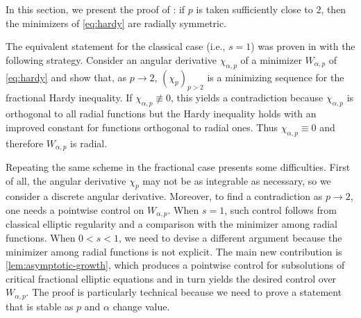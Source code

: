 \documentclass[10pt, reqno]{amsart}
\theoremstyle{plain}
\theoremstyle{remark}
\theoremstyle{definition}
\numberwithin{equation}{section}
\theoremstyle{plain}
\begin{document}
In this section, we present the proof of : if $p$ is taken sufficiently close to $2$, then the minimizers of \cref{eq:hardy} are radially symmetric. 

The equivalent statement for the classical case (i.e., $s=1$) was proven in \cite[Theorem 1.1]{Dolbeault2009} with the following strategy.
Consider an angular derivative $\chi_{\alpha, p}$ of a minimizer $W_{\alpha,p}$ of \cref{eq:hardy} and show that, as $p\to 2$, $(\chi_p)_{p>2}$ is a minimizing sequence for the fractional Hardy inequality. If $\chi_{\alpha, p}\not\equiv0$, this yields a contradiction because $\chi_{\alpha,p}$ is orthogonal to all radial functions but the Hardy inequality holds with an improved constant for functions orthogonal to radial ones. Thus $\chi_{\alpha,p}\equiv 0$ and therefore $W_{\alpha,p}$ is radial.

Repeating the same scheme in the fractional case presents some difficulties. First of all, the angular derivative $\chi_p$ may not be as integrable as necessary, so we consider a discrete angular derivative. 
Moreover, to find a contradiction as $p\to 2$, one needs a pointwise control on $W_{\alpha,p}$. When $s=1$, such control follows from classical elliptic regularity and a comparison with the minimizer among radial functions. 
 When $0<s<1$, we need to devise a different argument because the minimizer among radial functions is not explicit. The main new contribution is \cref{lem:asymptotic-growth}, which produces a pointwise control for subsolutions of critical fractional elliptic equations and in turn yields the desired control over $W_{\alpha,p}$. The proof is particularly technical because we need to prove a statement that is stable as $p$ and $\alpha$ change value. 
\end{document}
